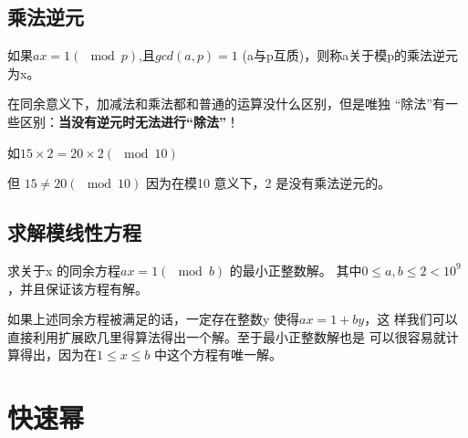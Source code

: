 \documentclass[lang=cn,11pt]{elegantbook}
\begin{document}
	\subsection{乘法逆元}
	如果$ax=1 (\mod p)$,且$gcd(a,p)=1$ (a与p互质)，则称a关于模p的乘法逆元为x。
	
	在同余意义下，加减法和乘法都和普通的运算没什么区别，但是唯独
	“除法”有一些区别：\textbf{当没有逆元时无法进行“除法”}！
	
	如$15\times 2 = 20\times 2 (\mod 10)$
	
	但	$15\neq 20 (\mod 10)$
	因为在模10 意义下，2 是没有乘法逆元的。
	
	\subsection{求解模线性方程}
		\begin{example}
		求关于x 的同余方程$ax =1 (\mod b)$ 的最小正整数解。
		其中$0 \leq a, b \leq 2<10^9$，并且保证该方程有解。
		
		如果上述同余方程被满足的话，一定存在整数y 使得$ax = 1+by$，这
		样我们可以直接利用扩展欧几里得算法得出一个解。至于最小正整数解也是
		可以很容易就计算得出，因为在$1 \leq x \leq b$ 中这个方程有唯一解。
	\end{example}
	\section{快速幂}
	
\end{document}

